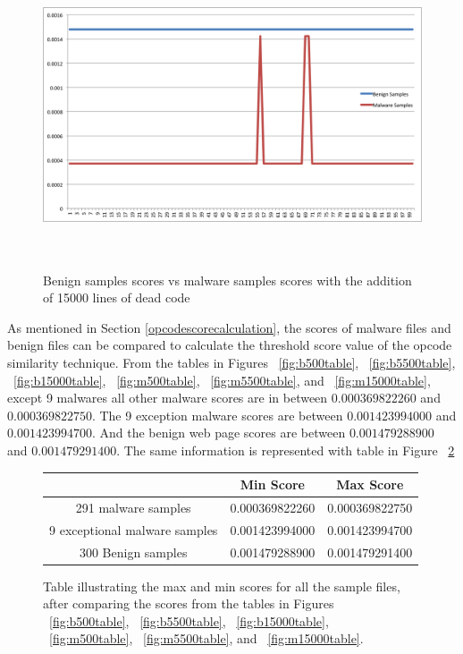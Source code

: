 \begin{figure}[h]
    \centering    
    \includegraphics[width=16cm, height=9.05cm]{15000.png}
    \caption[Benign Samples vs Malware Samples]{Benign samples scores vs malware samples scores with the addition of 15000 lines of dead code}
    \label{fig:bvsm15000}
\end{figure}

As mentioned in Section \ref{opcodescorecalculation}, the scores of malware files and benign files can be compared to calculate the threshold score value of the opcode similarity technique. From the tables in Figures ~\ref{fig:b500table}, ~\ref{fig:b5500table}, ~\ref{fig:b15000table}, ~\ref{fig:m500table}, ~\ref{fig:m5500table}, and ~\ref{fig:m15000table}, except 9 malwares all other malware scores are in between $0.000369822260$ and $0.000369822750$. The 9 exception malware scores are between $0.001423994000$ and $0.001423994700$. And the benign web page scores are between $0.001479288900$ and $0.001479291400$. The same information is represented with table in Figure ~\ref{fig:scoresummarytable}


\begin{figure}[h]
  \centering
  \begin{tabular}{|c|c|c|} 
  \midrule
 & Min Score& Max Score\\
\midrule
291 malware samples & 0.000369822260 & 0.000369822750\\ 
 \midrule 
9 exceptional malware samples & 0.001423994000 & 0.001423994700\\ 
 \midrule 
300 Benign samples &0.001479288900 & 0.001479291400 \\
 \midrule 
\end{tabular}
    \caption[Summary of max and min Scores]{Table illustrating the max and min scores for all the sample files, after comparing the scores from the tables in Figures ~\ref{fig:b500table}, ~\ref{fig:b5500table}, ~\ref{fig:b15000table}, ~\ref{fig:m500table}, ~\ref{fig:m5500table}, and ~\ref{fig:m15000table}. }
    \label{fig:scoresummarytable}
\end{figure}

